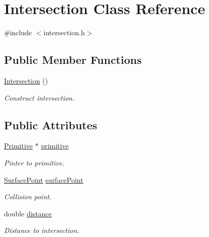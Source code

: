 \hypertarget{class_intersection}{}\section{Intersection Class Reference}
\label{class_intersection}


{\ttfamily \#include $<$intersection.\+h$>$}

\subsection*{Public Member Functions}
\begin{DoxyCompactItemize}
\item 
\mbox{\label{class_intersection_a67497e3efe2793b23909052eeb82c4f3}} 
\mbox{\hyperlink{class_intersection_a67497e3efe2793b23909052eeb82c4f3}{Intersection}} ()
\begin{DoxyCompactList}\small\item\em Construct intersection. \end{DoxyCompactList}\end{DoxyCompactItemize}
\subsection*{Public Attributes}
\begin{DoxyCompactItemize}
\item 
\mbox{\label{class_intersection_a80de47d40c5d3a8a7079cc13412be5e7}} 
\mbox{\hyperlink{class_primitive}{Primitive}} $\ast$ \mbox{\hyperlink{class_intersection_a80de47d40c5d3a8a7079cc13412be5e7}{primitive}}
\begin{DoxyCompactList}\small\item\em Pinter to primitive. \end{DoxyCompactList}\item 
\mbox{\label{class_intersection_a2f432340bee6925251ec4e7895ac3a39}} 
\mbox{\hyperlink{class_surface_point}{Surface\+Point}} \mbox{\hyperlink{class_intersection_a2f432340bee6925251ec4e7895ac3a39}{surface\+Point}}
\begin{DoxyCompactList}\small\item\em Collision point. \end{DoxyCompactList}\item 
\mbox{\label{class_intersection_a65da854f067b6f08175a97d262a17f1e}} 
double \mbox{\hyperlink{class_intersection_a65da854f067b6f08175a97d262a17f1e}{distance}}
\begin{DoxyCompactList}\small\item\em Distance to intersection. \end{DoxyCompactList}\end{DoxyCompactItemize}


